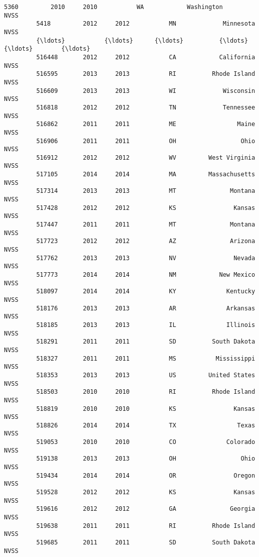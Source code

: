 \documentclass[11pt]{article}
\begin{document}
\begin{Verbatim}[commandchars=\\\{\}]
         5360         2010     2010           WA            Washington       NVSS   
         5418         2012     2012           MN             Minnesota       NVSS   
         {\ldots}           {\ldots}      {\ldots}          {\ldots}                   {\ldots}        {\ldots}   
         516448       2012     2012           CA            California       NVSS   
         516595       2013     2013           RI          Rhode Island       NVSS   
         516609       2013     2013           WI             Wisconsin       NVSS   
         516818       2012     2012           TN             Tennessee       NVSS   
         516862       2011     2011           ME                 Maine       NVSS   
         516906       2011     2011           OH                  Ohio       NVSS   
         516912       2012     2012           WV         West Virginia       NVSS   
         517105       2014     2014           MA         Massachusetts       NVSS   
         517314       2013     2013           MT               Montana       NVSS   
         517428       2012     2012           KS                Kansas       NVSS   
         517447       2011     2011           MT               Montana       NVSS   
         517723       2012     2012           AZ               Arizona       NVSS   
         517762       2013     2013           NV                Nevada       NVSS   
         517773       2014     2014           NM            New Mexico       NVSS   
         518097       2014     2014           KY              Kentucky       NVSS   
         518176       2013     2013           AR              Arkansas       NVSS   
         518185       2013     2013           IL              Illinois       NVSS   
         518291       2011     2011           SD          South Dakota       NVSS   
         518327       2011     2011           MS           Mississippi       NVSS   
         518353       2013     2013           US         United States       NVSS   
         518503       2010     2010           RI          Rhode Island       NVSS   
         518819       2010     2010           KS                Kansas       NVSS   
         518826       2014     2014           TX                 Texas       NVSS   
         519053       2010     2010           CO              Colorado       NVSS   
         519138       2013     2013           OH                  Ohio       NVSS   
         519434       2014     2014           OR                Oregon       NVSS   
         519528       2012     2012           KS                Kansas       NVSS   
         519616       2012     2012           GA               Georgia       NVSS   
         519638       2011     2011           RI          Rhode Island       NVSS   
         519685       2011     2011           SD          South Dakota       NVSS   
         

\end{Verbatim}
\end{document}
